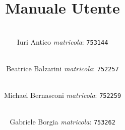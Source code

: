\subject{Progetto Climate Monitoring}
\title{Manuale Utente}
\subtitle{}
\author{
	\\Iuri Antico \textsl{matricola}:
	\texttt{753144}
	\and \\
	Beatrice Balzarini \textsl{matricola}:
	\texttt{752257}
	\and \\
	Michael Bernasconi \textsl{matricola}:
	\texttt{752259}
	\and \\
	Gabriele Borgia \textsl{matricola}:
	\texttt{753262}\\\\
}
\date{\ISOToday ~ \thistime}
